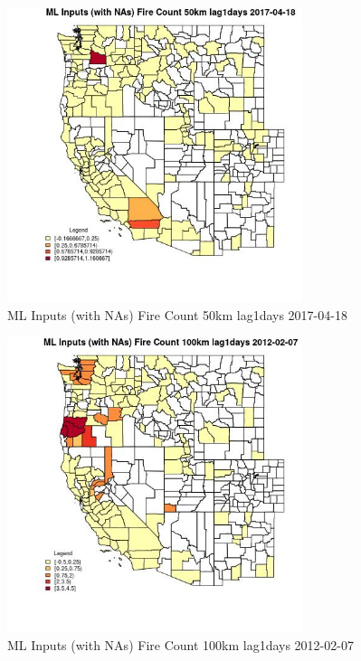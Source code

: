\begin{figure} 
\centering  
\includegraphics[width=0.77\textwidth]{Code_Outputs/Report_ML_input_PM25_Step4_part_f_de_duplicated_aveswNAs_CountyFire_Count_50km_lag1daysMean2017-04-18.jpg} 
\caption{\label{fig:Report_ML_input_PM25_Step4_part_f_de_duplicated_aveswNAsCountyFire_Count_50km_lag1daysMean2017-04-18}ML Inputs (with NAs) Fire Count 50km lag1days 2017-04-18} 
\end{figure} 
 

\begin{figure} 
\centering  
\includegraphics[width=0.77\textwidth]{Code_Outputs/Report_ML_input_PM25_Step4_part_f_de_duplicated_aveswNAs_CountyFire_Count_100km_lag1daysMean2012-02-07.jpg} 
\caption{\label{fig:Report_ML_input_PM25_Step4_part_f_de_duplicated_aveswNAsCountyFire_Count_100km_lag1daysMean2012-02-07}ML Inputs (with NAs) Fire Count 100km lag1days 2012-02-07} 
\end{figure} 
 


